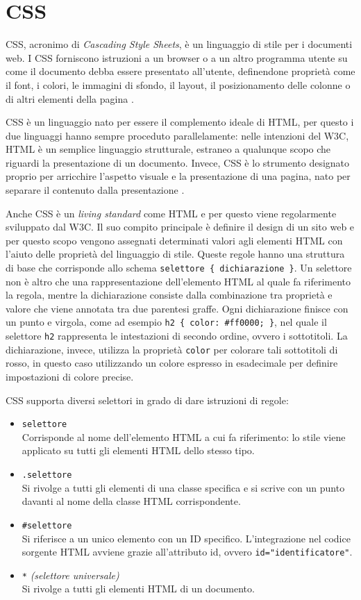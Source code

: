 \section{CSS}
CSS, acronimo di \textit{Cascading Style Sheets}, è un linguaggio di stile per i documenti web. I CSS forniscono istruzioni a un browser o a un altro programma utente su come il documento debba essere presentato all'utente, definendone proprietà come il font, i colori, le immagini di sfondo, il layout, il posizionamento delle colonne o di altri elementi della pagina \cite{CSS_Introduzione, CSS_Mozilla}.

CSS è un linguaggio nato per essere il complemento ideale di HTML, per questo i due linguaggi hanno sempre proceduto parallelamente: nelle intenzioni del W3C, HTML è un semplice linguaggio strutturale, estraneo a qualunque scopo che riguardi la presentazione di un documento. Invece, CSS è lo strumento designato proprio per arricchire l'aspetto visuale e la presentazione di una pagina, nato per separare il contenuto dalla presentazione \cite{CSS_Introduzione}.

Anche CSS è un \textit{living standard} come HTML e per questo viene regolarmente sviluppato dal W3C. Il suo compito principale è definire il design di un sito web e per questo scopo vengono assegnati determinati valori agli elementi HTML con l'aiuto delle proprietà del linguaggio di stile. Queste regole hanno una struttura di base che corrisponde allo schema \Verb_selettore { dichiarazione }_. Un selettore non è altro che una rappresentazione dell'elemento HTML al quale fa riferimento la regola, mentre la dichiarazione consiste dalla combinazione tra proprietà e valore che viene annotata tra due parentesi graffe. Ogni dichiarazione finisce con un punto e virgola, come ad esempio \Verb_h2 { color: #ff0000; }_, nel quale il selettore \Verb_h2_ rappresenta le intestazioni di secondo ordine, ovvero i sottotitoli. La dichiarazione, invece, utilizza la proprietà \Verb_color_ per colorare tali sottotitoli di rosso, in questo caso utilizzando un colore espresso in esadecimale per definire impostazioni di colore precise.

CSS supporta diversi selettori in grado di dare istruzioni di regole:
\begin{itemize}
    \item \Verb_selettore_\\
    Corrisponde al nome dell'elemento HTML a cui fa riferimento: lo stile viene applicato su tutti gli elementi HTML dello stesso tipo.
    \item \Verb_.selettore_\\
    Si rivolge a tutti gli elementi di una classe specifica e si scrive con un punto davanti al nome della classe HTML corrispondente.
    \item \Verb_#selettore_\\
    Si riferisce a un unico elemento con un ID specifico. L'integrazione nel codice sorgente HTML avviene grazie all'attributo id, ovvero \Verb_id="identificatore"_.
    \item \Verb_*_ \textit{(selettore universale)}\\
    Si rivolge a tutti gli elementi HTML di un documento.
\end{itemize}

